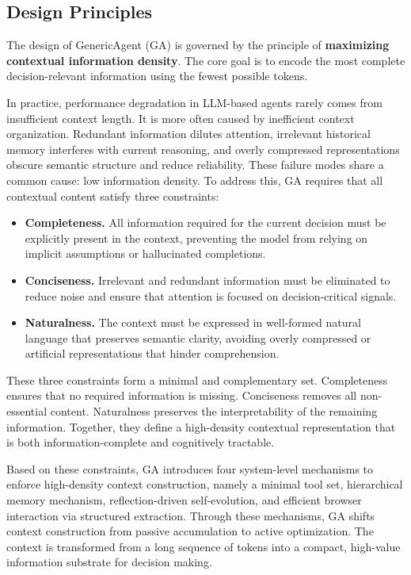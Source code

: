 \subsection{Design Principles}
\label{sec:principle}
\begin{AIbox}
The design of GenericAgent (GA) is governed by the principle of \textbf{maximizing contextual information density}. The core goal is to encode the most complete decision-relevant information using the fewest possible tokens.
\end{AIbox}

In practice, performance degradation in LLM-based agents rarely comes from insufficient context length. It is more often caused by inefficient context organization. Redundant information dilutes attention, irrelevant historical memory interferes with current reasoning, and overly compressed representations obscure semantic structure and reduce reliability. These failure modes share a common cause: low information density. To address this, GA requires that all contextual content satisfy three constraints:
\begin{itemize}
    \item \textbf{Completeness.} {\small
    All information required for the current decision must be explicitly present in the context, preventing the model from relying on implicit assumptions or hallucinated completions.
    }

    \item \textbf{Conciseness.} {\small
    Irrelevant and redundant information must be eliminated to reduce noise and ensure that attention is focused on decision-critical signals.
    }

    \item \textbf{Naturalness.} {\small
    The context must be expressed in well-formed natural language that preserves semantic clarity, avoiding overly compressed or artificial representations that hinder comprehension.
    }
\end{itemize}

These three constraints form a minimal and complementary set. Completeness ensures that no required information is missing. Conciseness removes all non-essential content. Naturalness preserves the interpretability of the remaining information. Together, they define a high-density contextual representation that is both information-complete and cognitively tractable.

Based on these constraints, GA introduces four system-level mechanisms to enforce high-density context construction, namely a minimal tool set, hierarchical memory mechanism, reflection-driven self-evolution, and efficient browser interaction via structured extraction. Through these mechanisms, GA shifts context construction from passive accumulation to active optimization. The context is transformed from a long sequence of tokens into a compact, high-value information substrate for decision making.


